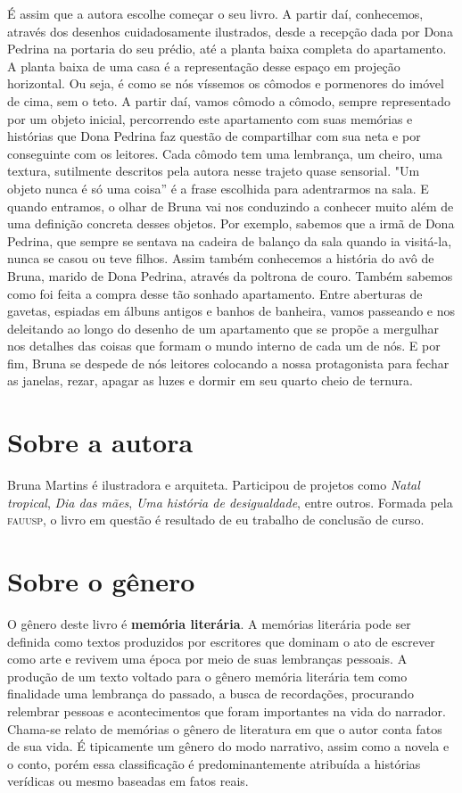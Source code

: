 \documentclass[11pt]{extarticle}
\begin{document}
É assim que a autora escolhe começar o seu livro. A partir daí, conhecemos, através dos desenhos cuidadosamente ilustrados, desde a recepção dada por Dona Pedrina na portaria do seu prédio, até a planta baixa completa do apartamento. A planta baixa de uma casa é a representação desse espaço em projeção horizontal. Ou seja, é como se nós víssemos os cômodos e pormenores do imóvel de cima, sem o teto. A partir daí, vamos cômodo a cômodo, sempre representado por um objeto inicial, percorrendo este apartamento com suas memórias e histórias que Dona Pedrina faz questão de compartilhar com sua neta e por conseguinte com os leitores. Cada cômodo tem uma lembrança, um cheiro, uma textura, sutilmente descritos pela autora nesse trajeto quase sensorial. "Um objeto nunca é só uma coisa” é a frase escolhida para adentrarmos na sala. E quando entramos, o olhar de Bruna vai nos conduzindo a conhecer muito além de uma definição concreta desses objetos. Por exemplo, sabemos que a irmã de Dona Pedrina, que sempre se sentava na cadeira de balanço da sala quando ia visitá-la, nunca se casou ou teve filhos. Assim também conhecemos a história do avô de Bruna, marido de Dona Pedrina, através da poltrona de couro. Também sabemos como foi feita a compra desse tão sonhado apartamento. Entre aberturas de gavetas, espiadas em álbuns antigos e banhos de banheira, vamos passeando e nos deleitando ao longo do desenho de um apartamento que se propõe a mergulhar nos detalhes das coisas que formam o mundo interno de cada um de nós. E por fim, Bruna se despede de nós leitores colocando a nossa protagonista para fechar as janelas, rezar, apagar as luzes e dormir em seu quarto cheio de ternura. 

\section{Sobre a autora}

Bruna Martins é ilustradora e arquiteta. Participou de projetos como \textit{Natal tropical}, \textit{Dia das mães}, \textit{Uma história de desigualdade}, entre outros. Formada pela \textsc{fauusp}, o livro em questão é resultado de eu trabalho de conclusão de curso.

\section{Sobre o gênero}

O gênero deste livro é \textbf{memória literária}. A memórias literária pode ser definida como textos produzidos por escritores que dominam o ato de escrever como arte e revivem uma época por meio de suas lembranças pessoais. A produção de um texto voltado para o gênero memória literária tem como finalidade uma lembrança do passado, a busca de recordações, procurando relembrar pessoas e acontecimentos que foram importantes na vida do narrador. Chama-se relato de memórias o gênero de literatura em que o autor conta fatos de sua vida. É tipicamente um gênero do modo narrativo, assim como a novela e o conto, porém essa classificação é predominantemente atribuída a histórias verídicas ou mesmo baseadas em fatos reais.
\end{document}
